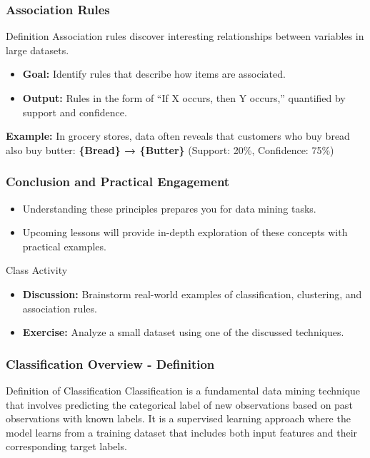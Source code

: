 \documentclass[aspectratio=169]{beamer}
\begin{document}
\begin{frame}[fragile]
    \frametitle{Association Rules}
    \begin{block}{Definition}
        Association rules discover interesting relationships between variables in large datasets.
    \end{block}
    \begin{itemize}
        \item \textbf{Goal:} Identify rules that describe how items are associated.
        \item \textbf{Output:} Rules in the form of ``If X occurs, then Y occurs,'' quantified by support and confidence.
    \end{itemize}
    \textbf{Example:}  
    In grocery stores, data often reveals that customers who buy bread also buy butter:  
    \textbf{\{Bread\} → \{Butter\}}  
    (Support: 20\%, Confidence: 75\%)
\end{frame}

\begin{frame}[fragile]
    \frametitle{Conclusion and Practical Engagement}
    \begin{itemize}
        \item Understanding these principles prepares you for data mining tasks.
        \item Upcoming lessons will provide in-depth exploration of these concepts with practical examples.
    \end{itemize}
    
    \begin{block}{Class Activity}
        \begin{itemize}
            \item \textbf{Discussion:} Brainstorm real-world examples of classification, clustering, and association rules.
            \item \textbf{Exercise:} Analyze a small dataset using one of the discussed techniques.
        \end{itemize}
    \end{block}
\end{frame}

\begin{frame}[fragile]
    \frametitle{Classification Overview - Definition}
    \begin{block}{Definition of Classification}
        Classification is a fundamental data mining technique that involves predicting the categorical label of new observations based on past observations with known labels. 
        It is a supervised learning approach where the model learns from a training dataset that includes both input features and their corresponding target labels.
    \end{block}
\end{frame}
\end{document}
